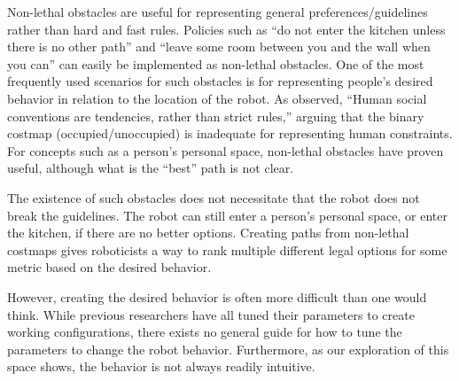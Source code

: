Non-lethal obstacles are useful for representing general preferences/guidelines rather than hard and fast rules. Policies such as ``do not enter the kitchen unless there is no other path'' and ``leave some room between you and the wall when you can'' can easily be implemented as non-lethal obstacles. One of the most frequently used scenarios for such obstacles is for representing people's desired behavior in relation to the location of the robot. As \citet{kirby:companion} observed, ``Human social conventions are tendencies, rather than strict rules,'' arguing that the binary costmap (occupied/unoccupied) is inadequate for representing human constraints. For concepts such as a person's personal space, non-lethal obstacles have proven useful, although what is the ``best'' path is not clear. 

The existence of such obstacles does not necessitate that the robot does not break the guidelines. The robot can still enter a person's personal space, or enter the kitchen, if there are no better options. Creating paths from non-lethal costmaps gives roboticists a way to rank multiple different legal options for some metric based on the desired behavior. 

However, creating the desired behavior is often more difficult than one would think. While previous researchers have all tuned their parameters to create working configurations, there exists no general guide for how to tune the parameters to change the robot behavior. Furthermore, as our exploration of this space shows, the behavior is not always readily intuitive. 




